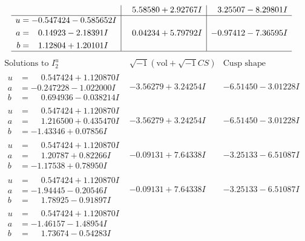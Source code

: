 \documentclass[1p]{elsarticle_modified}
\theoremstyle{definition}
\newcommand{\I}{\sqrt{-1}}
\begin{document}
$$\begin{array}{c|c|c}
 & \phantom{-}5.58580 + 2.92767 I & \phantom{-}3.25507 - 8.29801 I \\ \hline\begin{aligned}
u &= -0.547424 - 0.585652 I \\
a &= \phantom{-}0.14923 - 2.18391 I \\
b &= \phantom{-}1.12804 + 1.20101 I\end{aligned}
 & \phantom{-}0.04234 + 5.79792 I & -0.97412 - 7.36595 I\\
 \hline 
 \end{array}$$\newpage$$\begin{array}{c|c|c}  
\text{Solutions to }I^u_{2}& \I (\text{vol} + \sqrt{-1}CS) & \text{Cusp shape}\\
 \hline 
\begin{aligned}
u &= \phantom{-}0.547424 + 1.120870 I \\
a &= -0.247228 - 1.022000 I \\
b &= \phantom{-}0.694936 - 0.038214 I\end{aligned}
 & -3.56279 + 3.24254 I & -6.51450 - 3.01228 I \\ \hline\begin{aligned}
u &= \phantom{-}0.547424 + 1.120870 I \\
a &= \phantom{-}1.216500 + 0.435470 I \\
b &= -1.43346 + 0.07856 I\end{aligned}
 & -3.56279 + 3.24254 I & -6.51450 - 3.01228 I \\ \hline\begin{aligned}
u &= \phantom{-}0.547424 + 1.120870 I \\
a &= \phantom{-}1.20787 + 0.82266 I \\
b &= -1.17538 + 0.78950 I\end{aligned}
 & -0.09131 + 7.64338 I & -3.25133 - 6.51087 I \\ \hline\begin{aligned}
u &= \phantom{-}0.547424 + 1.120870 I \\
a &= -1.94445 - 0.20546 I \\
b &= \phantom{-}1.78925 - 0.91897 I\end{aligned}
 & -0.09131 + 7.64338 I & -3.25133 - 6.51087 I \\ \hline\begin{aligned}
u &= \phantom{-}0.547424 + 1.120870 I \\
a &= -1.46157 - 1.48954 I \\
b &= \phantom{-}1.73674 - 0.54283 I\end{aligned}

\end{array}$$
\end{document}
